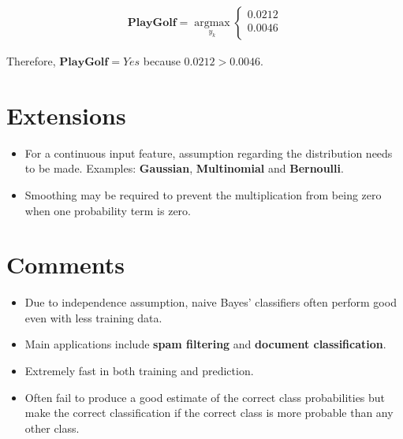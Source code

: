 \documentclass[11pt, a4paper]{article}
\begin{document}
\begin{align*}
	\mathbf{PlayGolf} = \operatorname*{argmax}_{y_k}\left\{
	\begin{array}{ll}
	0.0212
	                                                        \\
	0.0046                                                  \\
	\end{array}
	\right.
\end{align*}

Therefore, $\textbf{PlayGolf}=Yes$ because $0.0212 > 0.0046$.

\section{Extensions}

\begin{itemize}
	\item For a continuous input feature, assumption regarding the distribution needs to be made. Examples: \textbf{Gaussian}, \textbf{Multinomial} and \textbf{Bernoulli}.
	\item Smoothing may be required to prevent the multiplication from being zero when one probability term is zero.
\end{itemize}

\section{Comments}
\begin{itemize}
	\item Due to independence assumption, naive Bayes' classifiers often perform good even with less training data.
	\item Main applications include \textbf{spam filtering} and \textbf{document classification}.
	\item Extremely fast in both training and prediction.
	\item Often fail to produce a good estimate of the correct class probabilities but make the correct classification if the correct class is more probable than any other class.
\end{itemize}
\end{document}
